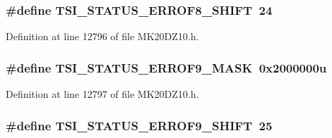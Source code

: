 \subsubsection[{\texorpdfstring{T\+S\+I\+\_\+\+S\+T\+A\+T\+U\+S\+\_\+\+E\+R\+R\+O\+F8\+\_\+\+S\+H\+I\+FT}{TSI_STATUS_ERROF8_SHIFT}}]{\setlength{\rightskip}{0pt plus 5cm}\#define T\+S\+I\+\_\+\+S\+T\+A\+T\+U\+S\+\_\+\+E\+R\+R\+O\+F8\+\_\+\+S\+H\+I\+FT~24}\hypertarget{group___t_s_i___register___masks_ga986ccc10faea0547409b9216cf2c898c}{}\label{group___t_s_i___register___masks_ga986ccc10faea0547409b9216cf2c898c}


Definition at line 12796 of file M\+K20\+D\+Z10.\+h.

\subsubsection[{\texorpdfstring{T\+S\+I\+\_\+\+S\+T\+A\+T\+U\+S\+\_\+\+E\+R\+R\+O\+F9\+\_\+\+M\+A\+SK}{TSI_STATUS_ERROF9_MASK}}]{\setlength{\rightskip}{0pt plus 5cm}\#define T\+S\+I\+\_\+\+S\+T\+A\+T\+U\+S\+\_\+\+E\+R\+R\+O\+F9\+\_\+\+M\+A\+SK~0x2000000u}\hypertarget{group___t_s_i___register___masks_gadbd7ab533117b69c24987220ced35dab}{}\label{group___t_s_i___register___masks_gadbd7ab533117b69c24987220ced35dab}


Definition at line 12797 of file M\+K20\+D\+Z10.\+h.

\subsubsection[{\texorpdfstring{T\+S\+I\+\_\+\+S\+T\+A\+T\+U\+S\+\_\+\+E\+R\+R\+O\+F9\+\_\+\+S\+H\+I\+FT}{TSI_STATUS_ERROF9_SHIFT}}]{\setlength{\rightskip}{0pt plus 5cm}\#define T\+S\+I\+\_\+\+S\+T\+A\+T\+U\+S\+\_\+\+E\+R\+R\+O\+F9\+\_\+\+S\+H\+I\+FT~25}\hypertarget{group___t_s_i___register___masks_ga43a4ab66c41c8209ba749f753c36477c}{}\label{group___t_s_i___register___masks_ga43a4ab66c41c8209ba749f753c36477c}


